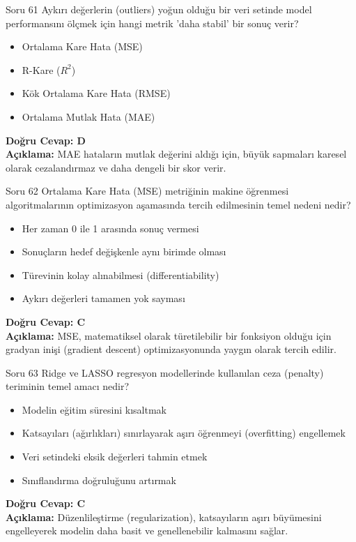 \documentclass[12pt,a4paper]{article}
\begin{document}
\begin{testcard}{Soru 61}
    Aykırı değerlerin (outliers) yoğun olduğu bir veri setinde model performansını ölçmek için hangi metrik 'daha stabil' bir sonuç verir?
    \begin{itemize}
        \item[A)] Ortalama Kare Hata (MSE)
        \item[B)] R-Kare ($R^2$)
        \item[C)] Kök Ortalama Kare Hata (RMSE)
        \item[D)] Ortalama Mutlak Hata (MAE)
    \end{itemize}
    \tcblower
    \textbf{Doğru Cevap: D} \\
    \textbf{Açıklama:} MAE hataların mutlak değerini aldığı için, büyük sapmaları karesel olarak cezalandırmaz ve daha dengeli bir skor verir.
\end{testcard}

\begin{testcard}{Soru 62}
    Ortalama Kare Hata (MSE) metriğinin makine öğrenmesi algoritmalarının optimizasyon aşamasında tercih edilmesinin temel nedeni nedir?
    \begin{itemize}
        \item[A)] Her zaman 0 ile 1 arasında sonuç vermesi
        \item[B)] Sonuçların hedef değişkenle aynı birimde olması
        \item[C)] Türevinin kolay alınabilmesi (differentiability)
        \item[D)] Aykırı değerleri tamamen yok sayması
    \end{itemize}
    \tcblower
    \textbf{Doğru Cevap: C} \\
    \textbf{Açıklama:} MSE, matematiksel olarak türetilebilir bir fonksiyon olduğu için gradyan inişi (gradient descent) optimizasyonunda yaygın olarak tercih edilir.
\end{testcard}

\begin{testcard}{Soru 63}
    Ridge ve LASSO regresyon modellerinde kullanılan ceza (penalty) teriminin temel amacı nedir?
    \begin{itemize}
        \item[A)] Modelin eğitim süresini kısaltmak
        \item[B)] Katsayıları (ağırlıkları) sınırlayarak aşırı öğrenmeyi (overfitting) engellemek
        \item[C)] Veri setindeki eksik değerleri tahmin etmek
        \item[D)] Sınıflandırma doğruluğunu artırmak
    \end{itemize}
    \tcblower
    \textbf{Doğru Cevap: C} \\
    \textbf{Açıklama:} Düzenlileştirme (regularization), katsayıların aşırı büyümesini engelleyerek modelin daha basit ve genellenebilir kalmasını sağlar.
\end{testcard}
\end{document}
